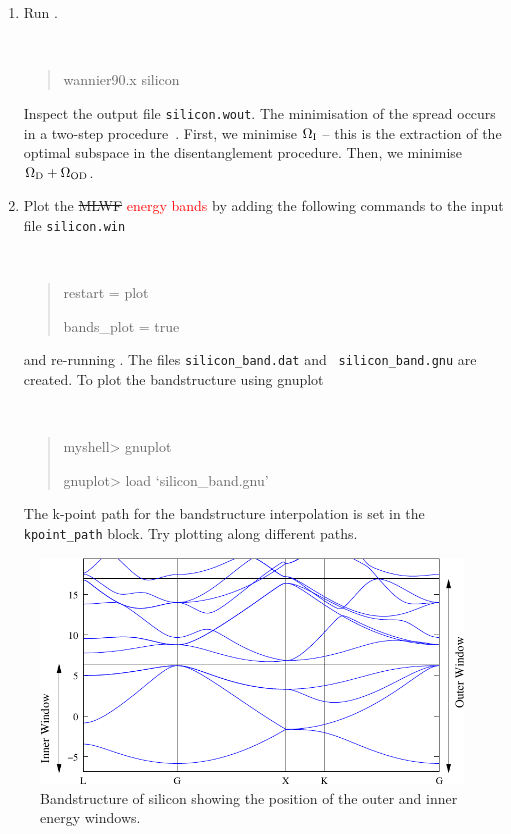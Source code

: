 \documentclass[a4paper,11pt,twoside]{article}
\def\tent#1{\textcolor{red}{#1}}     %
\begin{document}
\begin{enumerate}
\item Run \wannier.
{\tt
\begin{quote}
wannier90.x silicon
\end{quote} }
Inspect the output file {\tt silicon.wout}. The minimisation of the
spread occurs in a two-step procedure~\cite{SMV}. First, we minimise
$\Omega_{\rm I}$ -- this is the extraction of the optimal subspace in
the disentanglement procedure. Then, we minimise $\Omega_{\rm D} +
\Omega_{{\rm OD}}$.

\item Plot the \sout{MLWF} \tent{energy bands} by adding the following
  commands to the input file {\tt silicon.win} {\tt
\begin{quote}
restart = plot

bands\_plot = true
\end{quote} }
and re-running \wannier. The files {\tt silicon\_band.dat} and {\tt
  silicon\_band.gnu} are created. 
To plot the bandstructure using gnuplot
\smallskip
{\tt
\begin{quote}
myshell> gnuplot

gnuplot> load `silicon\_band.gnu'
\end{quote} }
The k-point path for the bandstructure interpolation is set in the {\tt
  kpoint\_path} block. Try plotting along different paths. 
\end{enumerate}

\begin{figure}[h]
\begin{center}
\includegraphics{si}
\caption{Bandstructure of silicon showing the position of the outer
  and inner energy windows.} 
\label{fig:si.bnd}
\end{center}
\end{figure}
\end{document}

